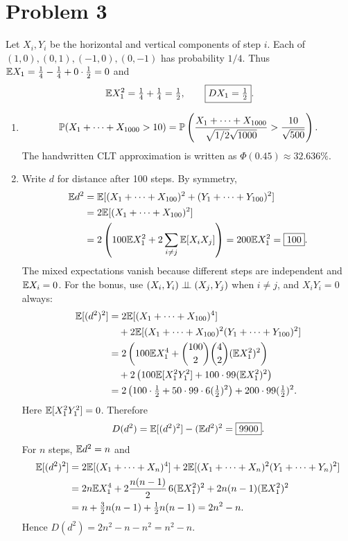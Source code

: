 \documentclass[a4paper]{article}
\begin{document}
\section*{Problem 3}
Let $X_i,Y_i$ be the horizontal and vertical components of step $i$.
Each of $(1,0),(0,1),(-1,0),(0,-1)$ has probability $1/4$.
Thus $\E X_1=\frac14-\frac14+0\cdot\frac12=0$ and
\[
\E X_1^2=\tfrac14+\tfrac14=\tfrac12,\qquad\boxed{DX_1=\tfrac12}.
\]
\begin{enumerate}
\item
\[
\P(X_1+\dots+X_{1000}>10)
=\P\left(\frac{X_1+\dots+X_{1000}}{\sqrt{1/2}\sqrt{1000}}>
\frac{10}{\sqrt{500}}\right).
\]
The handwritten CLT approximation is written as $\Phi(0.45)\approx\boxed{32.636\%}$.
\item Write $d$ for distance after 100 steps. By symmetry,
\begin{align*}
\E d^2&=\E[(X_1+\dots+X_{100})^2+(Y_1+\dots+Y_{100})^2]\\
&=2\E[(X_1+\dots+X_{100})^2]\\
&=2\left(100\E X_1^2+2\sum_{i\neq j}\E[X_iX_j]\right)
=200\E X_1^2=\boxed{100}.
\end{align*}
The mixed expectations vanish because different steps are independent and $\E X_i=0$.
For the bonus, use $(X_i,Y_i)\indep(X_j,Y_j)$ when $i\neq j$, and $X_iY_i=0$ always:
\begin{align*}
\E[(d^2)^2]
&=2\E[(X_1+\dots+X_{100})^4]\\
&\quad+2\E[(X_1+\dots+X_{100})^2(Y_1+\dots+Y_{100})^2]\\
&=2\left(100\E X_1^4+\binom{100}{2}\binom42(\E X_1^2)^2\right)\\
&\quad+2\left(100\E[X_1^2Y_1^2]+100\cdot99(\E X_1^2)^2\right)\\
&=2\left(100\cdot\tfrac12+50\cdot99\cdot6(\tfrac12)^2\right)
+200\cdot99(\tfrac12)^2.
\end{align*}
Here $\E[X_1^2Y_1^2]=0$. Therefore
\[
D(d^2)=\E[(d^2)^2]-(\E d^2)^2=\boxed{9900}.
\]
For $n$ steps, $\E d^2=n$ and
\begin{align*}
\E[(d^2)^2]
&=2\E[(X_1+\dots+X_n)^4]
+2\E[(X_1+\dots+X_n)^2(Y_1+\dots+Y_n)^2]\\
&=2n\E X_1^4+2\frac{n(n-1)}2\,6(\E X_1^2)^2
+2n(n-1)(\E X_1^2)^2\\
&=n+\tfrac32n(n-1)+\tfrac12n(n-1)=2n^2-n.
\end{align*}
Hence $\boxed{D(d^2)=2n^2-n-n^2=n^2-n}$.
\end{enumerate}
\end{document}
